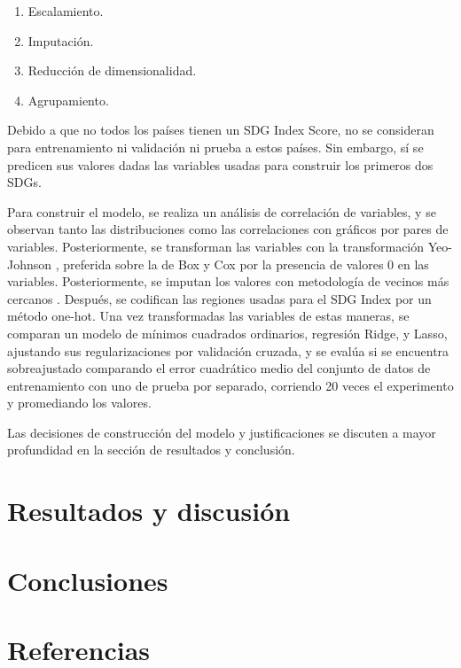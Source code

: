 \documentclass[a4paper,12pt]{amsart}
\begin{document}
    \begin{enumerate}
        \item Escalamiento.
        \item Imputación.
        \item Reducción de dimensionalidad.
        \item Agrupamiento.
    \end{enumerate}

    Debido a que no todos los países tienen un SDG Index Score, no se consideran
    para entrenamiento ni validación ni prueba a estos países. Sin embargo, sí 
    se predicen sus valores dadas las variables usadas para construir los primeros 
    dos SDGs.

    Para construir el modelo, se realiza un análisis de correlación de variables, 
    y se observan tanto las distribuciones como las correlaciones con gráficos 
    por pares de variables. Posteriormente, se transforman las variables con la 
    transformación Yeo-Johnson \cite{yeo_new_2000}, preferida sobre la de Box y Cox por la presencia 
    de valores 0 en las variables. Posteriormente, se imputan los valores con 
    metodología de vecinos más cercanos \cite{beretta_nearest_2016}. Después, 
    se codifican las regiones usadas para el SDG Index por un método one-hot. 
    Una vez transformadas las variables de estas maneras, se comparan un modelo 
    de mínimos cuadrados ordinarios, regresión Ridge, y Lasso, ajustando sus 
    regularizaciones por validación cruzada, y se evalúa si se encuentra 
    sobreajustado comparando el error cuadrático medio del conjunto de datos 
    de entrenamiento con uno de prueba por separado, corriendo 20 veces el 
    experimento y promediando los valores.

    Las decisiones de construcción del modelo y justificaciones se discuten a
    mayor profundidad en la sección de resultados y conclusión.

    \section{Resultados y discusión}
    

    \section{Conclusiones}

    \section{Referencias}
    \printbibliography
\end{document}
